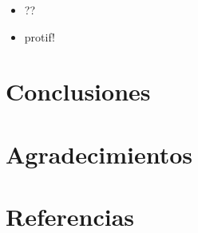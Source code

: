 \documentclass[spanish,a4paper]{book}
\providecommand{\tightlist}{%
  \setlength{\itemsep}{0pt}\setlength{\parskip}{0pt}}
\begin{document}
\begin{itemize}
\tightlist
\item
  ??
\item
  protif!
\end{itemize}

\chapter{Conclusiones}\label{conclusiones}

\chapter{Agradecimientos}\label{agradecimientos}

\chapter{Referencias}\label{referencias}
\end{document}
